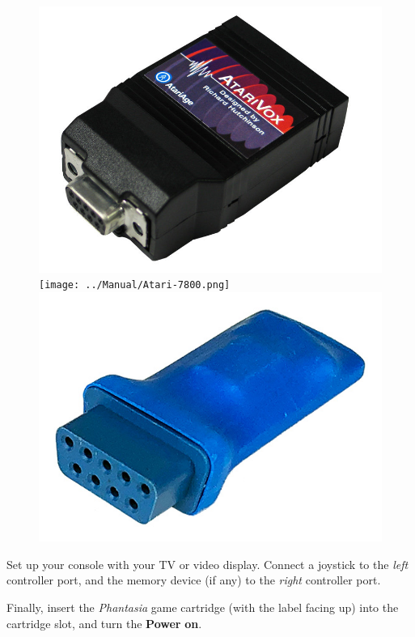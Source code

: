 \documentclass[10pt,twocolumn,openany,article]{memoir}
\begin{document}
\begin{figure}[b]
  \begin{center}
    \includegraphics[width=\columnwidth]{../Manual/AtariVox.jpeg}
    \ifdefined\ATARIAGESAVE
    \texttt{[image: ../Manual/Atari-7800.png]}
    \else
    \includegraphics[width=\columnwidth]{../Manual/SaveKey.jpeg}
    \fi
  \end{center}
\end{figure}

Set up your console with your TV or video display. Connect a joystick to
the \emph{left} controller port, and the memory
device (if any) to the \emph{right} controller port.

Finally, insert  the \textit{Phantasia}  game cartridge (with  the label
facing  up)  into  the  cartridge  slot,  and  turn  the  \textbf{Power}
\textbf{on}.
\end{document}
